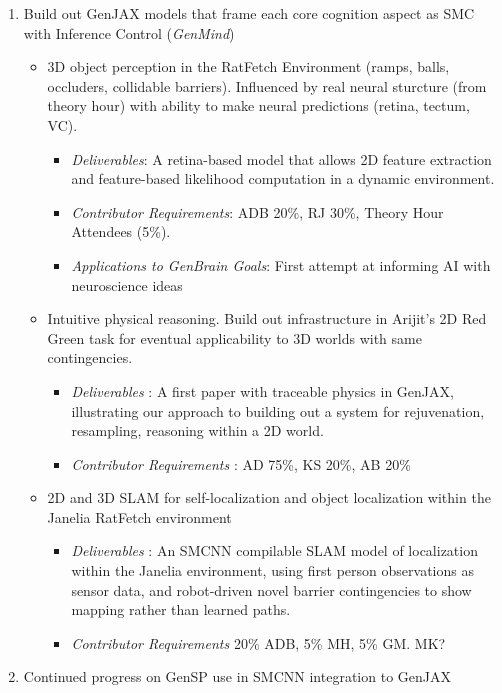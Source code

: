 \documentclass[
  letterpaper,
  DIV=11,
  numbers=noendperiod]{scrartcl}
\providecommand{\tightlist}{%
  \setlength{\itemsep}{0pt}\setlength{\parskip}{0pt}}\usepackage{longtable,booktabs,array}
\begin{document}
\begin{enumerate}
\def\labelenumi{\arabic{enumi}.}
\item
  Build out GenJAX models that frame each core cognition aspect as SMC
  with Inference Control (\emph{GenMind})

  \begin{itemize}
  \item
    3D object perception in the RatFetch Environment (ramps, balls,
    occluders, collidable barriers). Influenced by real neural sturcture
    (from theory hour) with ability to make neural predictions (retina,
    tectum, VC).

    \begin{itemize}
    \tightlist
    \item
      \emph{Deliverables}: A retina-based model that allows 2D feature
      extraction and feature-based likelihood computation in a dynamic
      environment.
    \item
      \emph{Contributor Requirements}: ADB 20\%, RJ 30\%, Theory Hour
      Attendees (5\%).
    \item
      \emph{Applications to GenBrain Goals}: First attempt at informing
      AI with neuroscience ideas
    \end{itemize}
  \item
    Intuitive physical reasoning. Build out infrastructure in Arijit's
    2D Red Green task for eventual applicability to 3D worlds with same
    contingencies.

    \begin{itemize}
    \tightlist
    \item
      \emph{Deliverables} : A first paper with traceable physics in
      GenJAX, illustrating our approach to building out a system for
      rejuvenation, resampling, reasoning within a 2D world.
    \item
      \emph{Contributor Requirements} : AD 75\%, KS 20\%, AB 20\%
    \end{itemize}
  \item
    2D and 3D SLAM for self-localization and object localization within
    the Janelia RatFetch environment

    \begin{itemize}
    \tightlist
    \item
      \emph{Deliverables} : An SMCNN compilable SLAM model of
      localization within the Janelia environment, using first person
      observations as sensor data, and robot-driven novel barrier
      contingencies to show mapping rather than learned paths.
    \item
      \emph{Contributor Requirements} 20\% ADB, 5\% MH, 5\% GM. MK?
    \end{itemize}
  \end{itemize}
\item
  Continued progress on GenSP use in SMCNN integration to GenJAX


\end{enumerate}
\end{document}
